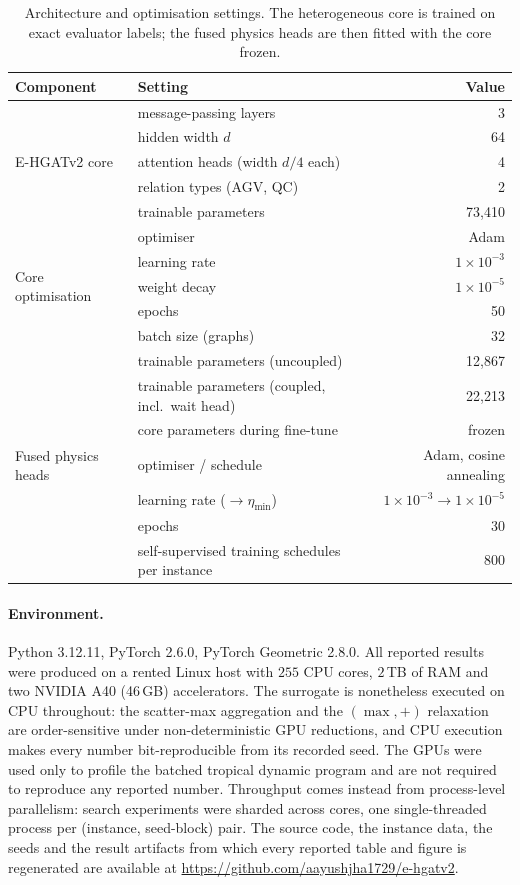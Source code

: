 \documentclass[11pt]{article}
\begin{document}
\begin{table}[h]
\centering
\small
\caption{Architecture and optimisation settings. The heterogeneous core is trained on
exact evaluator labels; the fused physics heads are then fitted with the core frozen.}
\label{tab:hyper}
\begin{tabular}{@{}llr@{}}
\toprule
\textbf{Component} & \textbf{Setting} & \textbf{Value} \\
\midrule
\multirow{5}{*}{E-HGATv2 core}
 & message-passing layers & 3 \\
 & hidden width $d$ & 64 \\
 & attention heads (width $d/4$ each) & 4 \\
 & relation types (AGV, QC) & 2 \\
 & trainable parameters & 73{,}410 \\
\midrule
\multirow{5}{*}{Core optimisation}
 & optimiser & Adam \\
 & learning rate & $1\times10^{-3}$ \\
 & weight decay & $1\times10^{-5}$ \\
 & epochs & 50 \\
 & batch size (graphs) & 32 \\
\midrule
\multirow{7}{*}{Fused physics heads}
 & trainable parameters (uncoupled) & 12{,}867 \\
 & trainable parameters (coupled, incl.\ wait head) & 22{,}213 \\
 & core parameters during fine-tune & frozen \\
 & optimiser / schedule & Adam, cosine annealing \\
 & learning rate ($\to\eta_{\min}$) & $1\times10^{-3}\to1\times10^{-5}$ \\
 & epochs & 30 \\
 & self-supervised training schedules per instance & 800 \\
\bottomrule
\end{tabular}
\end{table}

\paragraph{Environment.} Python 3.12.11, PyTorch 2.6.0, PyTorch Geometric 2.8.0. All
reported results were produced on a rented Linux host with $255$ CPU cores, $2$\,TB of RAM
and two NVIDIA A40 (46\,GB) accelerators. The surrogate is nonetheless executed on CPU
throughout: the scatter-max aggregation and the $(\max,+)$ relaxation are order-sensitive
under non-deterministic GPU reductions, and CPU execution makes every number
bit-reproducible from its recorded seed. The GPUs were used only to profile the batched
tropical dynamic program and are not required to reproduce any reported number. Throughput
comes instead from process-level parallelism: search experiments were sharded across cores,
one single-threaded process per (instance, seed-block) pair. The source code, the instance
data, the seeds and the result artifacts from which every reported table and figure is
regenerated are available at \url{https://github.com/aayushjha1729/e-hgatv2}.
\end{document}
